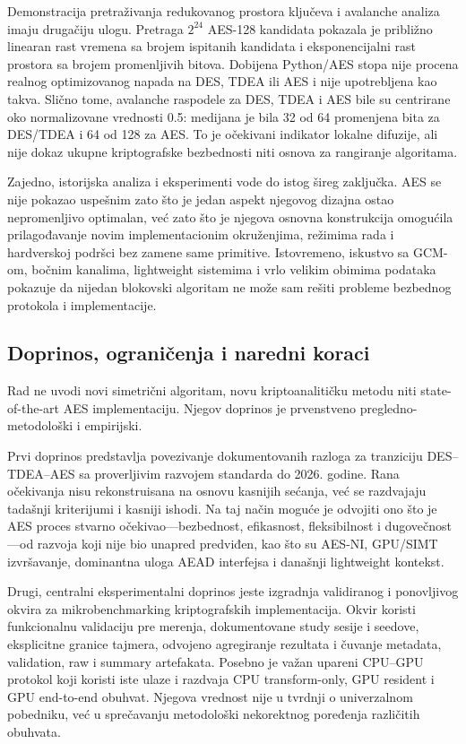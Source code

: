 Demonstracija pretraživanja redukovanog prostora ključeva i avalanche
analiza imaju drugačiju ulogu. Pretraga $2^{24}$ AES-128 kandidata pokazala
je približno linearan rast vremena sa brojem ispitanih kandidata i
eksponencijalni rast prostora sa brojem promenljivih bitova. Dobijena
Python/AES stopa nije procena realnog optimizovanog napada na DES, TDEA
ili AES i nije upotrebljena kao takva. Slično tome, avalanche raspodele
za DES, TDEA i AES bile su centrirane oko normalizovane vrednosti 0.5:
medijana je bila 32 od 64 promenjena bita za DES/TDEA i 64 od 128 za AES.
To je očekivani indikator lokalne difuzije, ali nije dokaz ukupne
kriptografske bezbednosti niti osnova za rangiranje algoritama.

Zajedno, istorijska analiza i eksperimenti vode do istog šireg zaključka.
AES se nije pokazao uspešnim zato što je jedan aspekt njegovog dizajna
ostao nepromenljivo optimalan, već zato što je njegova osnovna konstrukcija
omogućila prilagođavanje novim implementacionim okruženjima, režimima rada
i hardverskoj podršci bez zamene same primitive. Istovremeno, iskustvo
sa GCM-om, bočnim kanalima, lightweight sistemima i vrlo velikim obimima
podataka pokazuje da nijedan blokovski algoritam ne može sam rešiti
probleme bezbednog protokola i implementacije.

\subsection{Doprinos, ograničenja i naredni koraci}

Rad ne uvodi novi simetrični algoritam, novu kriptoanalitičku metodu niti
state-of-the-art AES implementaciju. Njegov doprinos je prvenstveno
pregledno-metodološki i empirijski.

Prvi doprinos predstavlja povezivanje dokumentovanih razloga za tranziciju
DES--TDEA--AES sa proverljivim razvojem standarda do 2026. godine. Rana
očekivanja nisu rekonstruisana na osnovu kasnijih sećanja, već se
razdvajaju tadašnji kriterijumi i kasniji ishodi. Na taj način moguće je
odvojiti ono što je AES proces stvarno očekivao---bezbednost, efikasnost,
fleksibilnost i dugovečnost---od razvoja koji nije bio unapred predviđen,
kao što su AES-NI, GPU/SIMT izvršavanje, dominantna uloga AEAD interfejsa
i današnji lightweight kontekst.

Drugi, centralni eksperimentalni doprinos jeste izgradnja validiranog i
ponovljivog okvira za mikrobenchmarking kriptografskih implementacija.
Okvir koristi funkcionalnu validaciju pre merenja, dokumentovane study
sesije i seedove, eksplicitne granice tajmera, odvojeno agregiranje
rezultata i čuvanje metadata, validation, raw i summary artefakata.
Posebno je važan upareni CPU--GPU protokol koji koristi iste ulaze i
razdvaja CPU transform-only, GPU resident i GPU end-to-end obuhvat.
Njegova vrednost nije u tvrdnji o univerzalnom pobedniku, već u
sprečavanju metodološki nekorektnog poređenja različitih obuhvata.

